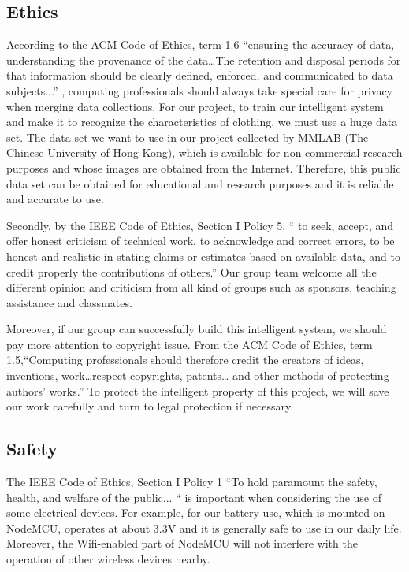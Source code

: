 
\subsection{Ethics}  
\noindent According to the ACM Code of Ethics, term 1.6 “ensuring the accuracy of data, understanding the provenance of the data…The retention and disposal periods for that information should be clearly defined, enforced, and communicated to data subjects...” \cite{acm-ethics}, computing professionals should always take special care for privacy when merging data collections. For our project, to train our intelligent system and make it to recognize the characteristics of clothing, we must use a huge data set. The data set we want to use in our project collected by MMLAB (The Chinese University of Hong Kong), which is available for non-commercial research purposes and whose images are obtained from the Internet. Therefore, this public data set can be obtained for educational and research purposes and it is reliable and accurate to use.  

\noindent Secondly, by the IEEE Code of Ethics, Section I Policy 5, “ to seek, accept, and offer honest
criticism of technical work, to acknowledge and correct errors, to be honest and realistic in stating claims or estimates based on available data, and to credit properly the
contributions of others.”\cite{ieee-ethics} Our group team welcome all the different opinion and criticism from all kind of groups such as sponsors, teaching assistance and classmates.  

\noindent Moreover, if our group can successfully build this intelligent system, we should pay more attention to copyright issue. From the ACM Code of Ethics, term 1.5,“Computing professionals should therefore credit the creators of ideas, inventions, work…respect copyrights, patents… and other methods of protecting authors' works.”\cite{acm-ethics} To protect the intelligent property of this project, we will save our work carefully and turn to legal protection if necessary.  

\subsection{Safety} 
\noindent The IEEE Code of Ethics, Section I Policy 1 “To hold paramount the safety, health, and welfare of the public... “ is important when considering the use of some electrical devices. For example, for our battery use, which is mounted on NodeMCU, operates at about 3.3V and it is generally safe to use in our daily life. Moreover, the Wifi-enabled part of NodeMCU will not interfere with the operation of other wireless devices nearby.  



